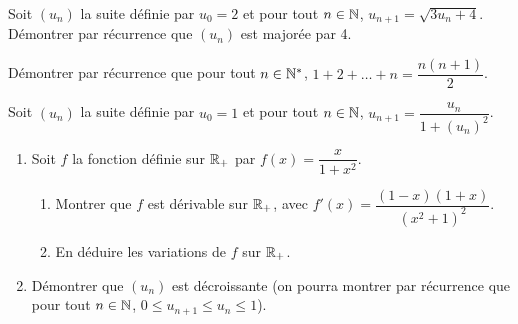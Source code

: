 \documentclass[a4paper,11pt,DIV12,BCOR0mm]{scrartcl}
\begin{document}
\begin{exercice}
 Soit $(u_n)$ la suite définie par $u_0=2$ et pour tout $n\in\mathbb{N}$, $u_{n+1}=\sqrt{3u_n+4}$.
Démontrer par récurrence que $(u_n)$ est majorée par 4.
\end{exercice}

\begin{exercice}
 Démontrer par récurrence que pour tout $n\in\mathbb{N}^*$, $1+2+\dots+n=\dfrac{n(n+1)}{2}$.
\end{exercice}

\begin{exercice}
 Soit $(u_n)$ la suite définie par $u_0=1$ et pour tout $n\in\mathbb{N}$, $u_{n+1}=\dfrac{u_n}{1+\left(u_n\right)^2}$.
\begin{enumerate}
 \item Soit $f$ la fonction définie sur $\mathbb{R}_+$ par $f(x)=\dfrac{x}{1+x^2}$.
      \begin{enumerate}
	  \item Montrer que $f$ est dérivable sur $\mathbb{R}_+$, avec $f'(x)=\dfrac{(1-x)(1+x)}{(x^2+1)^2}$.
	  \item En déduire les variations de $f$ sur $\mathbb{R}_+$.
      \end{enumerate}
 \item Démontrer que $(u_n)$ est décroissante (on pourra montrer par récurrence que pour tout $n\in\mathbb{N}$,
      $0\leq u_{n+1} \leq u_n \leq 1$).
\end{enumerate}
\end{exercice}
\end{document}
